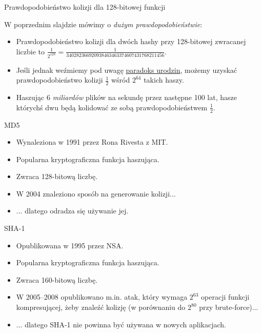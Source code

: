 \begin{frame}{Prawdopodobieństwo kolizji dla 128-bitowej funkcji}
	
	W poprzednim slajdzie mówimy o \emph{dużym prawdopodobieństwie}:

	\begin{itemize}
		\item Prawdopodobieństwo kolizji dla dwóch hashy przy 128-bitowej zwracanej liczbie to $\frac{1}{2^{128}}=\frac{1}{340282366920938463463374607431768211456}$.
		
		\item Jeśli jednak weźmiemy pod uwagę \href{http://en.wikipedia.org/wiki/Birthday_problem}{paradoks urodzin}, możemy uzyskać prawdopodobieństwo kolizji $\frac{1}{2}$ wśród $2^{64}$ takich haszy.
		
		\item Haszując 6 \emph{miliardów} plików na sekundę przez następne 100 lat, hasze którychś dwu będą kolidować ze sobą prawdopodobieństwem $\frac{1}{2}$.
	\end{itemize}	
	
\end{frame}

\begin{frame}{MD5}
	\begin{itemize}
		\item Wynaleziona w 1991 przez Rona Rivesta z MIT.
		\item Popularna kryptograficzna funkcja haszująca.
		\item Zwraca 128-bitową liczbę.
		\item W 2004 znaleziono sposób na generowanie kolizji...
		\item ... dlatego odradza się używanie jej.
	\end{itemize}
\end{frame}

\begin{frame}{SHA-1}
	\begin{itemize}
		\item Opublikowana w 1995 przez NSA.
		\item Popularna kryptograficzna funkcja haszująca.
		\item Zwraca 160-bitową liczbę.
		\item W 2005--2008 opublikowano m.in. atak, który wymaga $2^{63}$ operacji funkcji kompresującej, żeby znaleźć kolizję (w porównaniu do $2^{80}$ przy brute-force)...
		\item ... dlatego SHA-1 nie powinna być używana w nowych aplikacjach.
	\end{itemize}
\end{frame}

